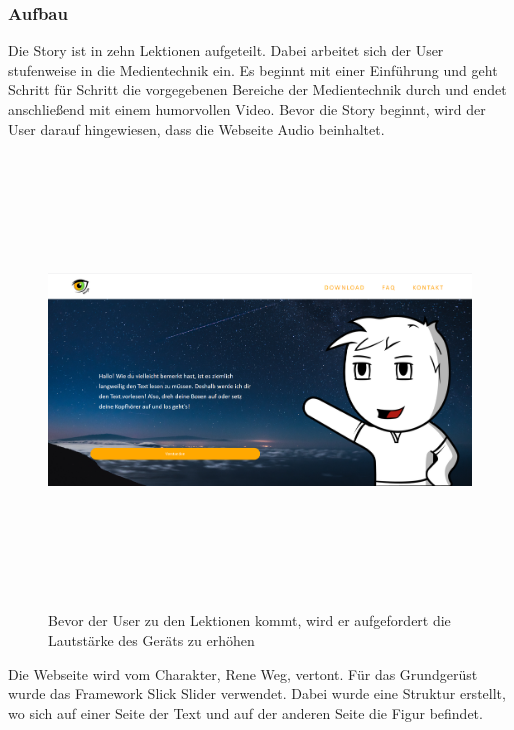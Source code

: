 \subsubsection{Aufbau}
Die Story ist in zehn Lektionen aufgeteilt. Dabei arbeitet sich der User stufenweise in die Medientechnik ein. Es beginnt mit einer Einführung und geht Schritt für Schritt die vorgegebenen Bereiche der Medientechnik durch und endet anschließend mit einem humorvollen Video. Bevor die Story beginnt, wird der User darauf hingewiesen, dass die Webseite Audio beinhaltet. 
\begin{figure}[H]
	\centering				\includegraphics[width=12cm,height=12cm,keepaspectratio]{webseite_abb8} 
	\caption{Bevor der User zu den Lektionen kommt, wird er aufgefordert die Lautstärke des Geräts zu erhöhen}
\end{figure}
Die Webseite wird vom Charakter, Rene Weg, vertont. 
Für das Grundgerüst wurde das Framework Slick Slider verwendet. Dabei wurde eine Struktur erstellt, wo sich auf einer Seite der Text und auf der anderen Seite die Figur befindet. 

